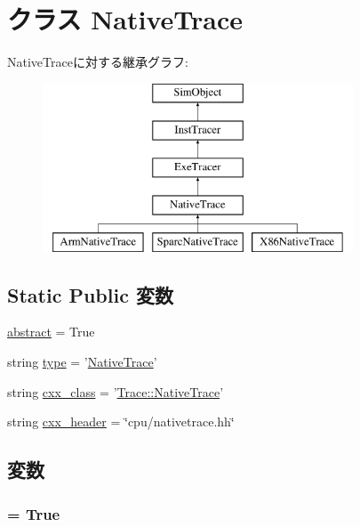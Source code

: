 \hypertarget{classNativeTrace_1_1NativeTrace}{
\section{クラス NativeTrace}
\label{classNativeTrace_1_1NativeTrace}
}
NativeTraceに対する継承グラフ:\begin{figure}[H]
\begin{center}
\leavevmode
\includegraphics[height=5cm]{classNativeTrace_1_1NativeTrace}
\end{center}
\end{figure}
\subsection*{Static Public 変数}
\begin{DoxyCompactItemize}
\item 
\hyperlink{classNativeTrace_1_1NativeTrace_a17fa61ac3806b481cafee5593b55e5d0}{abstract} = True
\item 
string \hyperlink{classNativeTrace_1_1NativeTrace_acce15679d830831b0bbe8ebc2a60b2ca}{type} = '\hyperlink{classNativeTrace_1_1NativeTrace}{NativeTrace}'
\item 
string \hyperlink{classNativeTrace_1_1NativeTrace_a58cd55cd4023648e138237cfc0822ae3}{cxx\_\-class} = '\hyperlink{classTrace_1_1NativeTrace}{Trace::NativeTrace}'
\item 
string \hyperlink{classNativeTrace_1_1NativeTrace_a17da7064bc5c518791f0c891eff05fda}{cxx\_\-header} = \char`\"{}cpu/nativetrace.hh\char`\"{}
\end{DoxyCompactItemize}


\subsection{変数}
\hypertarget{classNativeTrace_1_1NativeTrace_a17fa61ac3806b481cafee5593b55e5d0}{
\subsubsection[{abstract}]{ = True}}
\label{classNativeTrace_1_1NativeTrace_a17fa61ac3806b481cafee5593b55e5d0}


